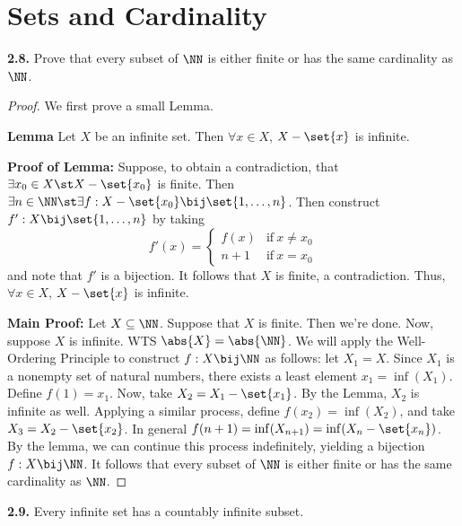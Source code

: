 \documentclass{fkbook}
\newenvironment{problem}[1][Problem \thesection.]
{\begin{boxedminipage}{\linewidth}\textbf{#1.}}
{\end{boxedminipage}}
\begin{document}
\chapter{Sets and Cardinality}
\begin{problem}[2.8]
  Prove that every subset of $\NN$ is either finite or has the same cardinality
  as $\NN$.
\end{problem}
\begin{proof}
  We first prove a small Lemma.

  \textbf{Lemma} Let $X$ be an infinite set. Then $\forall x \in X$, $X -
  \set{x}$ is infinite.

  \textbf{Proof of Lemma:} Suppose, to obtain a contradiction, that $\exists x_0
  \in X \st X - \set{x_0}$ is finite. Then $\exists n \in \NN \st \exists f : X
  - \set{x_0} \bij \set{1, \ldots, n}$. Then construct $f' : X \bij \set{1,
    \ldots, n}$ by taking
  \[
    f'(x) =
    \begin{cases}
      f(x) & \text{if}\ x \neq x_0 \\
      n+1 & \text{if}\ x = x_0
    \end{cases}
  \]
  and note that $f'$ is a bijection. It follows that $X$ is finite, a
  contradiction. Thus, $\forall x \in X$, $X - \set{x}$ is infinite.

  \textbf{Main Proof:}
  Let $X \subseteq \NN$. Suppose that $X$ is finite. Then we're done. Now,
  suppose $X$ is infinite. WTS $\abs{X} = \abs{\NN}$. We will apply the
  Well-Ordering Principle to construct $f : X \bij \NN$ as follows: let $X_1 =
  X$. Since $X_1$ is a nonempty set of natural numbers, there exists a least
  element $x_1 = \inf(X_1)$. Define $f(1) = x_1$. Now, take $X_2 = X_1 -
  \set{x_1}$. By the Lemma, $X_2$ is infinite as well. Applying a similar
  process, define $f(x_2) = \inf(X_2)$, and take $X_3 = X_2 - \set{x_2}$.
  In general $f(n+1) = \inf (X_{n+1}) = \inf (X_n - \set{x_n})$. By the lemma,
  we can continue this process indefinitely, yielding a bijection $f : X \bij
  \NN$. It follows that every subset of $\NN$ is either finite or has the same
  cardinality as $\NN$.
\end{proof}
\begin{problem}[2.9]
  Every infinite set has a countably infinite subset.
\end{problem}
\end{document}
